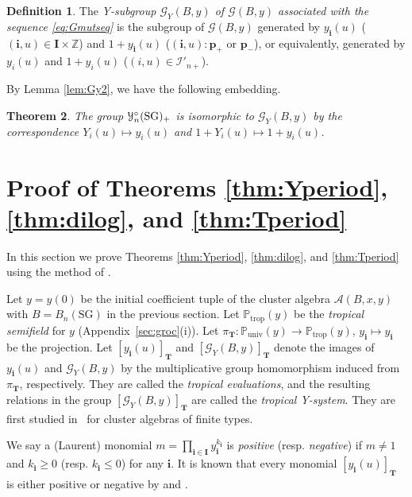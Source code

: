 \documentclass[11pt]{article}
\numberwithin{equation}{section}
\newtheorem{Theorem}{Theorem}[section]
\theoremstyle{definition}
\newtheorem{Definition}[Theorem]{Definition}
\begin{document}
\begin{Definition}
The {\em Y-subgroup
$\mathcal{G}_Y(B,y)$
of $\mathcal{G}(B,y)$
associated with the sequence \eqref{eq:Gmutseq}}
is the subgroup of
$\mathcal{G}(B,y)$
generated by
$y_{\mathbf{i}}(u)$
($(\mathbf{i},u)\in \mathbf{I}\times \mathbb{Z}$)
and $1+y_{\mathbf{i}}(u)$
($(\mathbf{i},u):\mathbf{p}_+$ or $\mathbf{p}_-$),
or equivalently,
generated by
$y_i(u)$ and $1+y_i(u)$
($(i,u)\in \mathcal{I}'_{n+}$).
\end{Definition}

By Lemma \ref{lem:Gy2}, we have the following embedding.
\begin{Theorem}
\label{thm:GYiso}
The group $\EuScript{Y}^{\circ}_{n}(\mathrm{SG})_+$ is isomorphic to
$\mathcal{G}_Y(B,y)$ by the correspondence
$Y_i(u)\mapsto y_i(u)$
and $1+Y_i(u)\mapsto 1+y_i(u)$.
\end{Theorem}


\section{Proof of
Theorems \ref{thm:Yperiod}, \ref{thm:dilog},
and \ref{thm:Tperiod}}
\label{sec:proofSG}

In this section we prove
Theorems \ref{thm:Yperiod}, \ref{thm:dilog},
and \ref{thm:Tperiod}
using the method of \cite{Nakanishi09,Inoue10a}.


Let $y=y(0)$ be the initial coef\/f\/icient tuple
of the cluster algebra $\mathcal{A}(B,x,y)$
with $B=B_{n}(\mathrm{SG})$ in the previous section.
Let
$\mathbb{P}_{\mathrm{trop}}(y)$ be
the {\em tropical semifield} for $y$ (Appendix~\ref{sec:groc}(i)).
Let $\pi_{\mathbf{T}}:
\mathbb{P}_{\mathrm{univ}}(y)\rightarrow
\mathbb{P}_{\mathrm{trop}}(y)$, $y_{\mathbf{i}}\mapsto
y_{\mathbf{i}}$ be the projection.
Let $[y_{\mathbf{i}}(u)]_{\mathbf{T}}$
and $[\mathcal{G}_Y(B,y)]_{\mathbf{T}}$
denote the images of $y_{\mathbf{i}}(u)$
and $\mathcal{G}_Y(B,y)$
by the multiplicative group
 homomorphism induced from $\pi_{\mathbf{T}}$, respectively.
They are called the {\em tropical evaluations},
and the resulting relations in
the group $[\mathcal{G}_Y(B,y)]_{\mathbf{T}}$
are called the {\em tropical Y-system}.
They are f\/irst studied in~\cite{Fomin03b}
for cluster algebras of f\/inite types.

We say a (Laurent) monomial $m=\prod_{\mathbf{i}\in \mathbf{I}}
y_{\mathbf{i}}^{k_{\mathbf{i}}}$
is {\em positive} (resp. {\em negative})
if $m\neq 1$ and $k_{\mathbf{i}}\geq 0$
(resp. $k_{\mathbf{i}}\leq 0$)
for any $\mathbf{i}$.
It is known that every monomial $[y_{\mathbf{i}}(u)]_{\mathbf{T}}$
is either positive or negative by \cite[Proposition 5.6]{Fomin07}
and \cite[Theorem 1.7]{Derksen10}.
\end{document}
